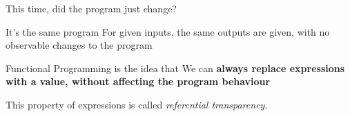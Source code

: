 \begin{frame}
\begin{center}
This time, did the program just change?
\end{center}
\end{frame}

\begin{frame}
\begin{block}{It's the same program}
For given inputs, the same outputs are given, with no observable changes to the program
\end{block}
\end{frame}

\begin{frame}
\begin{block}{Functional Programming is the idea that}
We can \textbf{always replace expressions with a value, without affecting the program behaviour}
\end{block}
\begin{center}
\tiny{This property of expressions is called \emph{referential transparency}.}
\end{center}
\end{frame}
